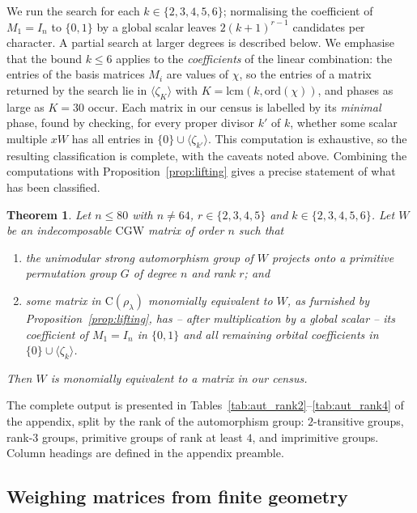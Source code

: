 \documentclass{article}
\newtheorem{theorem}{Theorem}[section]
\theoremstyle{definition}
\theoremstyle{remark}
\newcommand{\Cr}{\mathrm{C}}
\newcommand{\CGW}{\mathrm{CGW}}
\begin{document}
We run the search for each
$k \in \{2,3,4,5,6\}$; normalising the coefficient of $M_1 = I_n$ to
$\{0,1\}$ by a global scalar leaves $2(k+1)^{r-1}$ candidates per character.
A partial search at larger degrees is described below.  We emphasise that the
bound $k \leq 6$ applies to the \emph{coefficients} of the linear
combination: the entries of the basis matrices $M_i$ are values of $\chi$,
so the entries of a matrix returned by the search lie in
$\langle \zeta_K \rangle$ with $K = \mathrm{lcm}(k, \mathrm{ord}(\chi))$,
and phases as large as $K = 30$ occur. Each matrix in our census is
labelled by its \emph{minimal} phase, found by checking, for every proper
divisor $k'$ of $k$, whether some scalar multiple $xW$ has all entries in
$\{0\} \cup \langle \zeta_{k'} \rangle$.
This computation is exhaustive, so the resulting classification is
complete, with the caveats noted above. Combining the computations with Proposition~\ref{prop:lifting} gives a precise statement of what has been classified.

\begin{theorem}\label{thm:scope}
Let $n \leq 80$ with $n \neq 64$, $r \in \{2,3,4,5\}$ and
$k \in \{2,3,4,5,6\}$.  Let $W$ be an
indecomposable $\CGW$ matrix of order $n$ such that
\begin{enumerate}
\item the unimodular strong automorphism group of $W$ projects onto a
primitive permutation group $G$ of degree $n$ and rank $r$; and
\item some matrix in $\Cr(\rho_\lambda)$ monomially equivalent to $W$, as
furnished by Proposition~\ref{prop:lifting}, has -- after multiplication by
a global scalar -- its coefficient of $M_1 = I_n$ in $\{0,1\}$ and all
remaining orbital coefficients in $\{0\} \cup \langle \zeta_k \rangle$.
\end{enumerate}
Then $W$ is monomially equivalent to a matrix in our census.
\end{theorem}

The complete output is presented in
Tables~\ref{tab:aut_rank2}--\ref{tab:aut_rank4} of the appendix, split by
the rank of the automorphism group: $2$-transitive groups, rank-$3$ groups,
primitive groups of rank at least $4$, and imprimitive groups. Column
headings are defined in the appendix preamble.

\subsection{Weighing matrices from finite geometry}\label{sec:geom}
\end{document}
